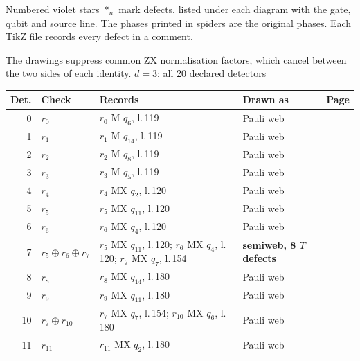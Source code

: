 \documentclass[11pt]{article}
\begin{document}
\begin{semiwebaddition}
\begin{minipage}[t]{.49\linewidth}
Numbered violet stars $\ast_n$ mark defects, listed under each diagram with the
gate, qubit and source line. The phases printed in spiders are the original
phases. Each TikZ file records every defect in a comment.
\end{minipage}
\vfill
\small The drawings suppress common ZX normalisation factors, which cancel between the two sides of each identity.
\newpage
{}
{\Large $d=3$: all 20 declared detectors}\par\medskip
{\large\setlength{\LTleft}{0pt}\setlength{\LTright}{\fill}
\begin{longtable}{rp{.3\linewidth}p{.43\linewidth}lr}
\toprule
Det. & Check & Records & Drawn as & Page\\
\midrule
\endhead
0 & $r_{0}$ & $r_{0}$ M $q_{6}$, l.\,119 & Pauli web & \hyperref[d3_det000]{\pageref*{d3_det000}}\\
1 & $r_{1}$ & $r_{1}$ M $q_{14}$, l.\,119 & Pauli web & \hyperref[d3_det001]{\pageref*{d3_det001}}\\
2 & $r_{2}$ & $r_{2}$ M $q_{8}$, l.\,119 & Pauli web & \hyperref[d3_det002]{\pageref*{d3_det002}}\\
3 & $r_{3}$ & $r_{3}$ M $q_{5}$, l.\,119 & Pauli web & \hyperref[d3_det003]{\pageref*{d3_det003}}\\
4 & $r_{4}$ & $r_{4}$ MX $q_{2}$, l.\,120 & Pauli web & \hyperref[d3_det004]{\pageref*{d3_det004}}\\
5 & $r_{5}$ & $r_{5}$ MX $q_{11}$, l.\,120 & Pauli web & \hyperref[d3_det005]{\pageref*{d3_det005}}\\
6 & $r_{6}$ & $r_{6}$ MX $q_{4}$, l.\,120 & Pauli web & \hyperref[d3_det006]{\pageref*{d3_det006}}\\
7 & $r_{5}\oplus r_{6}\oplus r_{7}$ & $r_{5}$ MX $q_{11}$, l.\,120; $r_{6}$ MX $q_{4}$, l.\,120; $r_{7}$ MX $q_{7}$, l.\,154 & \textbf{semiweb, 8 $T$ defects} & \hyperref[d3_det007]{\pageref*{d3_det007}}\\
8 & $r_{8}$ & $r_{8}$ MX $q_{14}$, l.\,180 & Pauli web & \hyperref[d3_det008]{\pageref*{d3_det008}}\\
9 & $r_{9}$ & $r_{9}$ MX $q_{11}$, l.\,180 & Pauli web & \hyperref[d3_det009]{\pageref*{d3_det009}}\\
10 & $r_{7}\oplus r_{10}$ & $r_{7}$ MX $q_{7}$, l.\,154; $r_{10}$ MX $q_{6}$, l.\,180 & Pauli web & \hyperref[d3_det010]{\pageref*{d3_det010}}\\
11 & $r_{11}$ & $r_{11}$ MX $q_{2}$, l.\,180 & Pauli web & \hyperref[d3_det011]{\pageref*{d3_det011}}\\

\end{longtable}}
\end{semiwebaddition}
\end{document}
